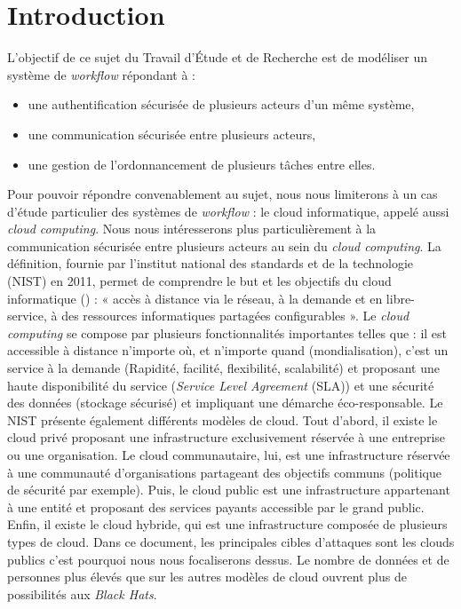 \begingroup
\renewcommand{\cleardoublepage}{}
\renewcommand{\clearpage}{}
\chapter{Introduction}
\endgroup

L'objectif de ce sujet du Travail d'Étude et de Recherche est de modéliser un système de \textit{workflow} répondant à :
\begin{itemize}
	\item une authentification sécurisée de plusieurs acteurs d’un même système,
	\item une communication sécurisée entre plusieurs acteurs,
	\item une gestion de l’ordonnancement de plusieurs tâches entre elles.
\end{itemize}

Pour pouvoir répondre convenablement au sujet, nous nous limiterons à un cas d'étude particulier des systèmes de \textit{workflow} : le cloud informatique, appelé aussi \textit{cloud computing}. Nous nous intéresserons plus particulièrement à la communication sécurisée entre plusieurs acteurs au sein du \textit{cloud computing}.
\newline
La définition, fournie par l'institut national des standards et de la technologie (NIST) en 2011, permet de comprendre le but et les objectifs du cloud informatique (\cite{definition_cloud}) : « accès à distance via le réseau, à la demande et en libre-
service, à des ressources informatiques partagées
configurables ». Le \textit{cloud computing} se compose par plusieurs fonctionnalités
importantes telles que : il est accessible à distance n’importe où, et n'importe quand (mondialisation), c'est un service à la demande (Rapidité, facilité, flexibilité, scalabilité) et proposant une haute disponibilité du service (\textit{Service Level Agreement} (\gls{SLA})) et une sécurité des données (stockage sécurisé) et impliquant une démarche éco-responsable.
Le NIST présente également différents modèles de cloud.
Tout d'abord, il existe le cloud privé proposant une infrastructure exclusivement réservée à une entreprise ou une organisation.
Le cloud communautaire, lui, est une infrastructure réservée à une communauté d'organisations partageant des objectifs communs (politique de sécurité par exemple). Puis, le cloud public est une infrastructure appartenant à une entité et proposant des services payants accessible par le grand public. Enfin, il existe le cloud hybride, qui est une infrastructure composée de plusieurs types de cloud.
Dans ce document, les principales cibles d'attaques sont les clouds publics c'est pourquoi nous nous focaliserons dessus. Le nombre de données et de personnes plus élevés que sur les autres modèles de cloud ouvrent plus de possibilités aux \textit{\gls{Black Hats}}.

